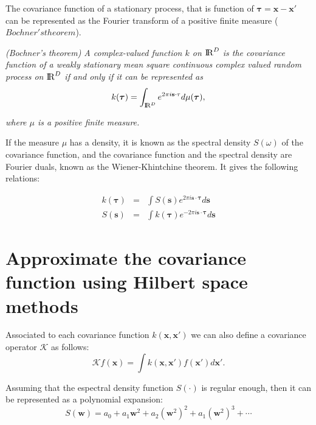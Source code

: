 \documentclass[]{interact}
\theoremstyle{plain}%
\theoremstyle{definition}
\theoremstyle{remark}
\begin{document}
The covariance function of a stationary process, that is function of $\boldsymbol{\tau}=\mathbf{x-x'}$ can be represented as the Fourier transform of a positive finite measure ($Bochner's theorem$). 

\vspace{0.2cm}
\textit{(Bochner’s theorem) A complex-valued function $k$ on ${\rm I\!R}^D$ is the covariance function of a weakly stationary mean square continuous complex valued random process on ${\rm I\!R}^D$ if and only if it can be represented as}
%
\begin{equation}
k(\boldsymbol{\tau})= \int_{{\rm I\!R}^D} e^{2\pi i \mathbf{s} \cdot \mathbf{\tau}} d\mu(\boldsymbol{\tau}), \nonumber 
\end{equation}

\textit{where $\mu$ is a positive finite measure.} 

\vspace{0.2cm}
If the measure $\mu$ has a density, it is known as the spectral density $S(\omega)$ of the covariance function, and the covariance function and the spectral density are Fourier duals, known as the Wiener-Khintchine theorem. It gives the following relations:

\begin{eqnarray}
k(\boldsymbol{\tau})&=& \int S(\mathbf{s}) e^{2\pi i \mathbf{s} \cdot \boldsymbol{\tau}} d\mathbf{s}  \nonumber \\
%
S(\mathbf{s})&=& \int k(\boldsymbol{\tau}) e^{-2\pi i \mathbf{s} \cdot \boldsymbol{\tau}} d\mathbf{s}  \nonumber
\end{eqnarray}

\section{Approximate the covariance function using Hilbert space methods}

Associated to each covariance function $k(\mathbf{x},\mathbf{x}')$ we can also define a covariance operator $\mathcal{K}$ as follows:
%
\begin{equation}
\mathcal{K} f(\mathbf{x}) = \int k(\mathbf{x},\mathbf{x}') f(\mathbf{x}') d\mathbf{x}'.
\end{equation} 

Assuming that the espectral density function $S(\cdot)$ is regular enough, then it can be represented as a polynomial expansion:
%
\begin{equation}
S(\mathbf{w})=a_0+a_1\mathbf{w}^2+a_2(\mathbf{w}^2)^2+a_1(\mathbf{w}^2)^3+\cdots
\end{equation}
\end{document}
